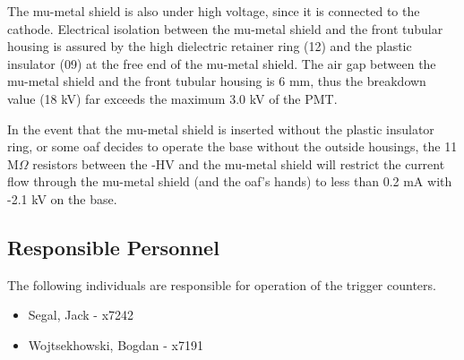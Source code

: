 The mu-metal shield is also under high voltage, since it is connected to the 
cathode. Electrical isolation between the mu-metal shield and the front 
tubular housing is assured by the high dielectric retainer ring (12) and the 
plastic insulator (09) at the free end of the mu-metal shield. The air gap 
between the mu-metal shield and the front tubular housing is 6 mm, thus the 
breakdown value (18 kV) far exceeds the maximum 3.0 kV of the PMT.

In the event that the mu-metal shield is inserted without the plastic insulator 
ring, or some oaf decides to operate the base without the outside housings, the 
11 M$\Omega$ resistors between the -HV and the mu-metal shield will restrict the 
current flow through the mu-metal shield (and the oaf's hands) to less than 0.2 
mA with -2.1 kV on the base. 

\subsection{Responsible Personnel} 
The following individuals are responsible for operation of the trigger counters. 
\begin{itemize}
\item[~]Segal, Jack - x7242 
\item[~]Wojtsekhowski, Bogdan - x7191 
\end{itemize} 








%
